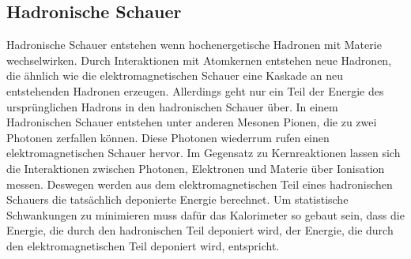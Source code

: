 \subsection{Hadronische Schauer}
Hadronische Schauer entstehen wenn hochenergetische Hadronen mit Materie wechselwirken. Durch Interaktionen mit Atomkernen entstehen neue Hadronen, die ähnlich wie die elektromagnetischen Schauer eine Kaskade an neu entstehenden Hadronen erzeugen. Allerdings geht nur ein Teil der Energie des ursprünglichen Hadrons in den hadronischen Schauer über. In einem Hadronischen Schauer entstehen unter anderen Mesonen Pionen, die zu zwei Photonen zerfallen können. Diese Photonen wiederrum rufen einen elektromagnetischen Schauer hervor. Im Gegensatz zu Kernreaktionen lassen sich die Interaktionen zwischen Photonen, Elektronen und Materie über Ionisation messen. Deswegen werden aus dem elektromagnetischen Teil eines hadronischen Schauers die tatsächlich deponierte Energie berechnet. Um statistische Schwankungen zu minimieren muss dafür das Kalorimeter so gebaut sein, dass die Energie, die durch den hadronischen Teil deponiert wird, der Energie, die durch den elektromagnetischen Teil deponiert wird, entspricht.

